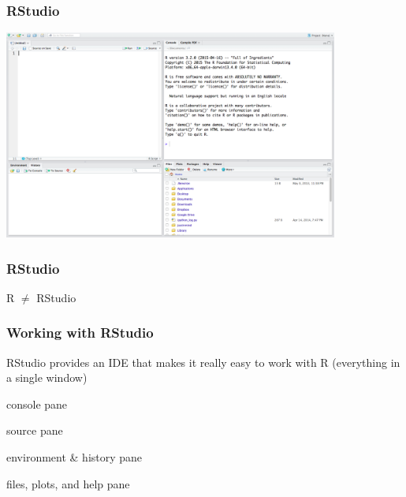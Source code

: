 \documentclass[12pt]{beamer}\usepackage[]{graphicx}\usepackage[]{color}
\begin{document}

\begin{frame}
\begin{center}
\Huge{}
\end{center}
\end{frame}


\begin{frame}
\frametitle{RStudio}

\begin{center}
\includegraphics[width=11cm]{images/r-studio.png}
\end{center}

\end{frame}


\begin{frame}
\frametitle{RStudio}

\begin{center}
\Huge R $\neq$ RStudio
\end{center}

\end{frame}


\begin{frame}
\frametitle{Working with RStudio}

RStudio provides an IDE that makes it really easy to work with R (everything in a single window)

\bi
  \item console pane
  \item source pane
  \item environment \& history pane
  \item files, plots, and help pane
\ei

\end{frame}
\end{document}
